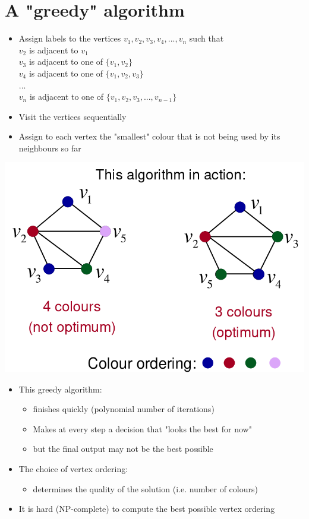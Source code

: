 \documentclass{article}[18pt]
\begin{document}
\section{A "greedy" algorithm}
\begin{itemize}
\item Assign labels to the vertices $v_1,v_2,v_3,v_4,...,v_n$ such that\\
$v_2$ is adjacent to $v_1$\\
$v_3$ is adjacent to one of $\{v_1,v_2\}$\\
$v_4$ is adjacent to one of $\{v_1,v_2,v_3\}$\\
...\\
$v_n$ is adjacent to one of $\{v_1,v_2,v_3,...,v_{n-1}\}$
\item Visit the vertices sequentially
\item Assign to each vertex the "smallest" colour that is not being used by its neighbours so far
\end{itemize}
\begin{center}
\includegraphics[scale=0.7]{greedy}
\end{center}
\begin{itemize}
\item This greedy algorithm:
\begin{itemize}
\item finishes quickly (polynomial number of iterations)
\item Makes at every step a decision that "looks the best for now"
\item but the final output may not be the best possible
\end{itemize}
\item The choice of vertex ordering:
\begin{itemize}
\item determines the quality of the solution (i.e. number of colours)
\end{itemize}
\item It is hard (NP-complete) to compute the best possible vertex ordering
\end{itemize}
\end{document}
